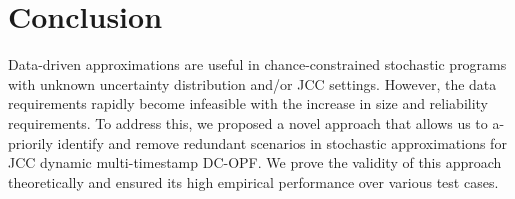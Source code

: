 
\section{Conclusion}\label{sec:conclusion}
Data-driven approximations are useful in chance-constrained stochastic programs with unknown uncertainty distribution and/or JCC settings. However, the data requirements rapidly become infeasible with the increase in size and reliability requirements. To address this, we proposed a novel approach that allows us to a-priorily identify and remove redundant scenarios in stochastic approximations for JCC dynamic multi-timestamp DC-OPF. We prove the validity of this approach theoretically and 
ensured its high empirical performance over various test cases. 